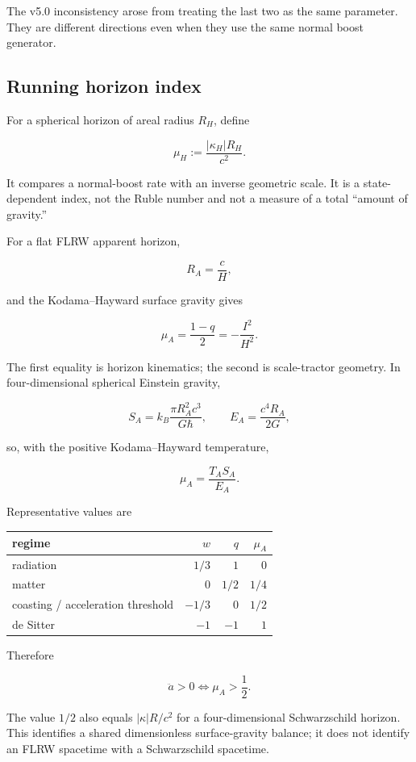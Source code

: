\documentclass[
  11pt,
  letterpaper,
]{article}
\begin{document}
The v5.0 inconsistency arose from treating the last two as the same
parameter. They are different directions even when they use the same
normal boost generator.

\subsection{Running horizon index}\label{running-horizon-index}

For a spherical horizon of areal radius \(R_H\), define

\[
\boxed{
\mu_H:=\frac{|\kappa_H|R_H}{c^2}.
}
\]

It compares a normal-boost rate with an inverse geometric scale. It is a
state-dependent index, not the Ruble number and not a measure of a total
``amount of gravity.''

For a flat FLRW apparent horizon,

\[
R_A=\frac{c}{H},
\]

and the Kodama--Hayward surface gravity gives

\[
\boxed{
\mu_A=\frac{1-q}{2}=-\frac{I^2}{H^2}.
}
\]

The first equality is horizon kinematics; the second is scale-tractor
geometry. In four-dimensional spherical Einstein gravity,

\[
S_A=k_B\frac{\pi R_A^2c^3}{G\hbar},
\qquad
E_A=\frac{c^4R_A}{2G},
\]

so, with the positive Kodama--Hayward temperature,

\[
\mu_A=\frac{T_AS_A}{E_A}.
\]

Representative values are

\begin{longtable}[]{@{}lrrr@{}}
\toprule\noalign{}
regime & \(w\) & \(q\) & \(\mu_A\) \\
\midrule\noalign{}
\endhead
\bottomrule\noalign{}
\endlastfoot
radiation & \(1/3\) & \(1\) & \(0\) \\
matter & \(0\) & \(1/2\) & \(1/4\) \\
coasting / acceleration threshold & \(-1/3\) & \(0\) & \(1/2\) \\
de Sitter & \(-1\) & \(-1\) & \(1\) \\
\end{longtable}

Therefore

\[
\boxed{
\ddot a>0\iff\mu_A>\frac12.
}
\]

The value \(1/2\) also equals \(|\kappa|R/c^2\) for a four-dimensional
Schwarzschild horizon. This identifies a shared dimensionless
surface-gravity balance; it does not identify an FLRW spacetime with a
Schwarzschild spacetime.
\end{document}
